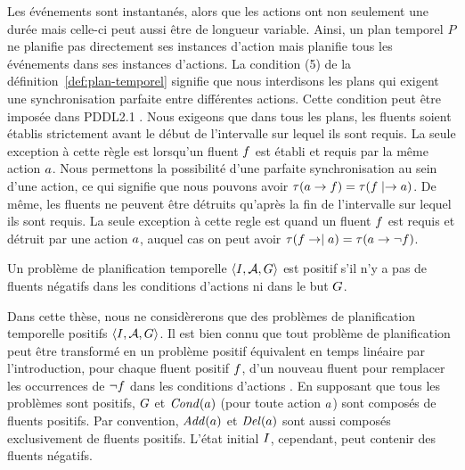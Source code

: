 Les événements sont instantanés, alors que les actions ont non seulement une durée mais celle-ci peut aussi être de longueur variable. Ainsi, un plan temporel $P$ ne planifie pas directement ses instances d'action mais planifie tous les événements dans ses instances d'actions.
La condition (5) de la définition~\ref{def:plan-temporel} signifie que nous interdisons les plans qui exigent une synchronisation parfaite entre différentes actions. %
Cette condition peut être imposée dans PDDL2.1 \cite{DBLP:conf/ecai/FoxLH04}. Nous exigeons que dans tous les plans, les fluents soient établis strictement avant le début de l'intervalle sur lequel ils sont requis. La seule exception à cette règle est lorsqu'un fluent $f$ est établi et requis par la même action $a$. Nous permettons la possibilité d'une parfaite synchronisation au sein d'une action, ce qui signifie que nous pouvons avoir $\tau(a\rightarrow f)=\tau(f\mid\rightarrow a)$.
De même, les fluents ne peuvent être détruits qu'après la fin de l'intervalle sur lequel ils sont requis. La seule exception à cette regle est quand un fluent $f$ est requis et détruit par une action $a$, auquel cas on peut avoir $\tau(f\rightarrow\mid a)=\tau(a\rightarrow\neg f)$. %

\begin{definition}
Un problème de planification temporelle $\langle I, \mathcal{A}, G \rangle$ est positif s'il n'y a pas de fluents négatifs dans les conditions d'actions ni dans le but $G$.
\end{definition}

Dans cette thèse, nous ne considèrerons que des problèmes de planification temporelle positifs $\langle I, \mathcal{A}, G \rangle$. Il est bien connu que tout problème de planification peut être transformé en un problème positif équivalent en temps linéaire par l'introduction, pour chaque fluent positif $f$, d'un nouveau fluent pour remplacer les occurrences de $\neg f$ dans les conditions d'actions \cite{DBLP:books/daglib/0014222}. %
En supposant que tous les problèmes sont positifs, $G$ et $\mathit{Cond}(a)$ (pour toute action $a$) sont composés de fluents positifs. Par convention, $\mathit{Add}(a)$ et $\mathit{Del}(a)$ sont aussi composés exclusivement de fluents positifs. L'état initial $I$, cependant, peut contenir des fluents négatifs.


